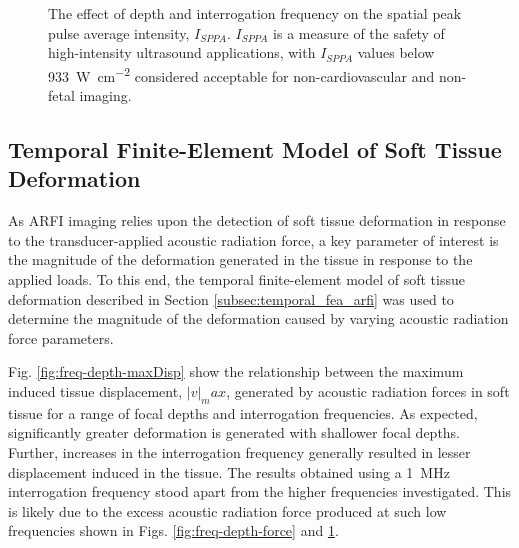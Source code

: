 			\begin{figure}[!htb]
				\centering
				\caption[$I_{SPPA}$ safety measures of ARFI pulses]{The effect of depth and interrogation frequency on the spatial peak pulse average intensity, $I_{SPPA}$. $I_{SPPA}$ is a measure of the safety of high-intensity ultrasound applications, with $I_{SPPA}$ values below \SI{933}{\W\per\cm\squared} considered acceptable for non-cardiovascular and non-fetal imaging.}
				\label{fig:freq-depth-isppa}
			\end{figure}

		\FloatBarrier
		\subsection{Temporal Finite-Element Model of Soft Tissue Deformation}
		\label{subsec:arfi_deformation_results}
			As ARFI imaging relies upon the detection of soft tissue deformation in response to the transducer-applied acoustic radiation force, a key parameter of interest is the magnitude of the deformation generated in the tissue in response to the applied loads. To this end, the temporal finite-element model of soft tissue deformation described in Section \ref{subsec:temporal_fea_arfi} was used to determine the magnitude of the deformation caused by varying acoustic radiation force parameters.

			Fig. \ref{fig:freq-depth-maxDisp} show the relationship between the maximum induced tissue displacement, $\left|v\right|_max$, generated by acoustic radiation forces in soft tissue for a range of focal depths and interrogation frequencies. As expected, significantly greater deformation is generated with shallower focal depths. Further, increases in the interrogation frequency generally resulted in lesser displacement induced in the tissue. The results obtained using a \SI{1}{\MHz} interrogation frequency stood apart from the higher frequencies investigated. This is likely due to the excess acoustic radiation force produced at such low frequencies shown in Figs. \ref{fig:freq-depth-force} and \ref{fig:freq-depth-isppa}.


